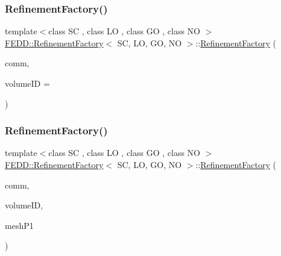 \subsubsection{\texorpdfstring{Refinement\+Factory()}{RefinementFactory()}\hspace{0.1cm}{\footnotesize\ttfamily [2/3]}}
{\footnotesize\ttfamily template$<$class SC , class LO , class GO , class NO $>$ \\
\hyperlink{classFEDD_1_1RefinementFactory}{F\+E\+D\+D\+::\+Refinement\+Factory}$<$ SC, LO, GO, NO $>$\+::\hyperlink{classFEDD_1_1RefinementFactory}{Refinement\+Factory} (\begin{DoxyParamCaption}\item[{\hyperlink{classFEDD_1_1RefinementFactory_a58381e0786c65ec61d11bc73c224b45a}{Comm\+Const\+Ptr\+\_\+\+Type}}]{comm,  }\item[{int}]{volume\+ID = {} }\end{DoxyParamCaption})}

\mbox{\label{classFEDD_1_1RefinementFactory_a59e3730c7f4ee1769e34da85250d0d86}} 
\subsubsection{\texorpdfstring{Refinement\+Factory()}{RefinementFactory()}\hspace{0.1cm}{\footnotesize\ttfamily [3/3]}}
{\footnotesize\ttfamily template$<$class SC , class LO , class GO , class NO $>$ \\
\hyperlink{classFEDD_1_1RefinementFactory}{F\+E\+D\+D\+::\+Refinement\+Factory}$<$ SC, LO, GO, NO $>$\+::\hyperlink{classFEDD_1_1RefinementFactory}{Refinement\+Factory} (\begin{DoxyParamCaption}\item[{\hyperlink{classFEDD_1_1RefinementFactory_a58381e0786c65ec61d11bc73c224b45a}{Comm\+Const\+Ptr\+\_\+\+Type}}]{comm,  }\item[{int}]{volume\+ID,  }\item[{\hyperlink{classFEDD_1_1RefinementFactory_a1a278d01c278972af01f2996247af8ac}{Mesh\+Unstr\+Ptr\+\_\+\+Type}}]{mesh\+P1 }\end{DoxyParamCaption})}

